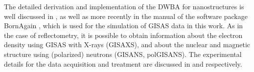 \documentclass[\main/dresen_thesis.tex]{subfiles}
\begin{document}
    The detailed derivation and implementation of the DWBA for nanostructures is well discussed in \cite{Lazzari_2002_Isgis}, as well as more recently in the manual of the software package BornAgain \cite{Burle_2018_borna}, which is used for the simulation of GISAS data in this work.
    As in the case of reflectometry, it is possible to obtain information about the electron density using GISAS with X-rays (GISAXS), and about the nuclear and magnetic structure using (polarized) neutrons (GISANS, polGISANS).
    The experimental details for the data acquisition and treatment are discussed in  and  respectively.
\end{document}
